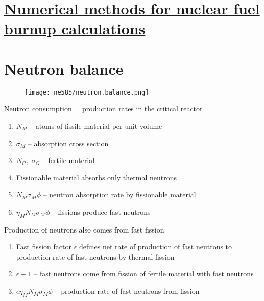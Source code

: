 \documentclass[aspectratio=1610,pdftex,dvipsnames,compress,xcolor={dvipsnames}]{beamer}
\begin{document}
\section{\href{https://serpent.vtt.fi/serpent/download/S32.pdf}{Numerical methods for nuclear fuel burnup calculations}}
\section{Neutron balance}


\addtocounter{framenumber}{-2} 
\begin{frame}{}
    \begin{figure}
        \centering
        \texttt{[image: ne585/neutron.balance.png]}
    \end{figure}
\end{frame}


\begin{frame}{Neutron consumption = production rates in the critical reactor}
    \begin{enumerate}[series=outerlist,topsep=0pt,itemsep=21pt,leftmargin=*,label=(\arabic*)]
        \item[]$N_M$ -- atoms of fissile material per unit volume
        \item[]$\sigma_M$ -- absorption cross section
        \item[]$N_G, \; \sigma_G$ -- fertile material
        \item[]Fissionable material absorbs only thermal neutrons
        \item[]$N_M\sigma_M\phi$ -- neutron absorption rate by fissionable material
        \item[]$\eta_M N_M\sigma_M\phi$ -- fissions produce fast neutrons
    \end{enumerate}
\end{frame}


\begin{frame}{Production of neutrons also comes from fast fission}
    \begin{enumerate}[series=outerlist,topsep=0pt,itemsep=21pt,leftmargin=*,label=(\arabic*)]
        \item[]Fast fission factor $\epsilon$ defines net rate of production of fast neutrons to production rate of fast neutrons by thermal fission
        \item[]$\epsilon - 1$ -- fast neutrons come from fission of fertile material with fast neutrons
        \item[]$\epsilon\eta_M N_M \sigma_M \phi$ -- production rate of fast neutrons from fission
    \end{enumerate}
\end{frame}
\end{document}
